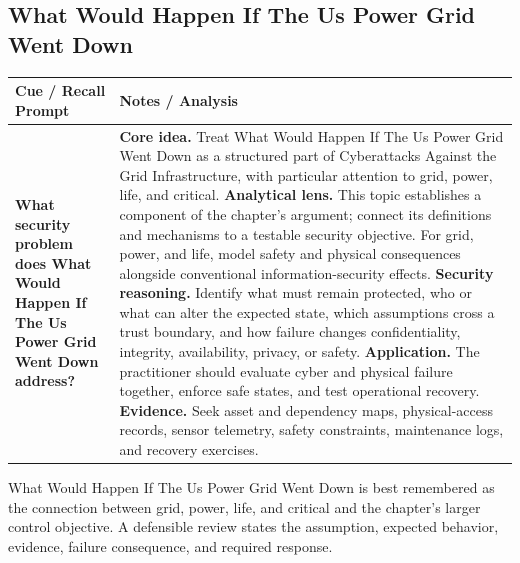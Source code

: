 \documentclass[11pt]{article}
\newcommand{\CornellHeader}{%
\rowcolor{Navy}\color{white}\bfseries Cue / Recall Prompt & \color{white}\bfseries Notes / Analysis\\\hline}
\newcommand{\CornellRow}[2]{%
\cellcolor{CueGray}\RaggedRight\textbf{#1} & \RaggedRight #2\\\hline}
\begin{document}
\subsection*{What Would Happen If The Us Power Grid Went Down}
\begin{longtable}{>{\RaggedRight\arraybackslash}p{}|>{\RaggedRight\arraybackslash}p{}}
\CornellHeader
\CornellRow{What security problem does What Would Happen If The Us Power Grid Went Down address?}{\textbf{Core idea.} Treat What Would Happen If The Us Power Grid Went Down as a structured part of Cyberattacks Against the Grid Infrastructure, with particular attention to grid, power, life, and critical. \textbf{Analytical lens.} This topic establishes a component of the chapter's argument; connect its definitions and mechanisms to a testable security objective. For grid, power, and life, model safety and physical consequences alongside conventional information-security effects. \textbf{Security reasoning.} Identify what must remain protected, who or what can alter the expected state, which assumptions cross a trust boundary, and how failure changes confidentiality, integrity, availability, privacy, or safety. \textbf{Application.} The practitioner should evaluate cyber and physical failure together, enforce safe states, and test operational recovery. \textbf{Evidence.} Seek asset and dependency maps, physical-access records, sensor telemetry, safety constraints, maintenance logs, and recovery exercises.}
\end{longtable}
\begin{topicsummary}
What Would Happen If The Us Power Grid Went Down is best remembered as the connection between grid, power, life, and critical and the chapter's larger control objective. A defensible review states the assumption, expected behavior, evidence, failure consequence, and required response.
\end{topicsummary}
\end{document}
